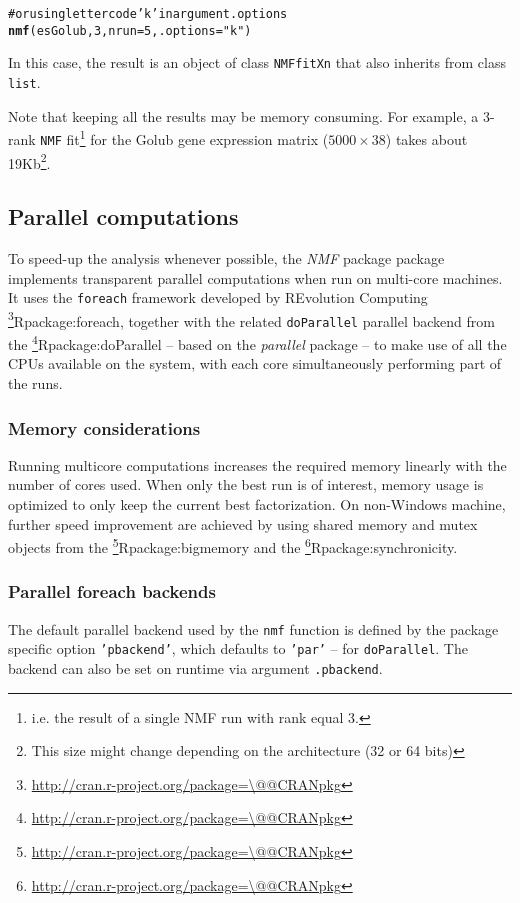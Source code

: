 \documentclass[a4paper]{article}\usepackage{graphicx, color}
\makeatletter
\newcommand{\hlfunctioncall}[1]{\textcolor[rgb]{0.501960784313725,0,0.329411764705882}{\textbf{#1}}}%
\newcommand{\hlstring}[1]{\textcolor[rgb]{0.6,0.6,1}{#1}}%
\newcommand{\hlcomment}[1]{\textcolor[rgb]{0.180392156862745,0.6,0.341176470588235}{#1}}%
\newenvironment{kframe}{%
 \def\at@end@of@kframe{}%
 \ifinner\ifhmode%
  \def\at@end@of@kframe{\end{minipage}}%
  \begin{minipage}{\columnwidth}%
 \fi\fi%
 \def\FrameCommand##1{\hskip\@totalleftmargin \hskip-\fboxsep
 \colorbox{shadecolor}{##1}\hskip-\fboxsep
     \hskip-\linewidth \hskip-\@totalleftmargin \hskip\columnwidth}%
 \MakeFramed {\advance\hsize-\width
   \@totalleftmargin\z@ \linewidth\hsize
   \@setminipage}}%
 {\par\unskip\endMakeFramed%
 \at@end@of@kframe}
\newenvironment{knitrout}{}{} %
\let\code=\texttt
\newcommand{\pkgname}[1]{\textit{#1}\xspace}
\newcommand{\Rpkg}[1]{\pkgname{#1} package\xspace}
\newcommand{\CRANurl}[1]{\url{http://cran.r-project.org/package=#1}}
\def\CRANpkg{\@ifstar\@CRANpkg\@@CRANpkg}
\def\@CRANpkg#1{\href{http://cran.r-project.org/package=#1}{\pkgname{#1}}\footnote{\CRANurl{#1}}}
\def\@@CRANpkg#1{\href{http://cran.r-project.org/package=#1}{\pkgname{#1}} package\footnote{\CRANurl{#1}}}
\def\citeCRANpkg{\@ifstar\@citeCRANpkg\@@citeCRANpkg}
\def\@citeCRANpkg#1{\CRANpkg{#1}\cite*{Rpackage:#1}}
\def\@@citeCRANpkg#1{\CRANpkg{#1}~\cite{Rpackage:#1}}
\newcommand{\nmfpack}{\Rpkg{NMF}}
\renewcommand{\cite}[1]{\parencite{#1}}
\makeatother
\begin{document}
\begin{knitrout}
\color{fgcolor}\begin{kframe}
\begin{alltt}
\hlcomment{# or using letter code 'k' in argument .options}
\hlfunctioncall{nmf}(esGolub, 3, nrun = 5, .options = \hlstring{"k"})
\end{alltt}
\end{kframe}
\end{knitrout}


In this case, the result is an object of class \code{NMFfitXn} that also inherits from class \code{list}.

Note that keeping all the results may be memory consuming. 
For example, a 3-rank \code{NMF} fit\footnote{i.e. the result of a single NMF run with rank equal 3.} for the Golub gene expression matrix ($5000 \times 38$) takes about 19Kb\footnote{This size might change depending on the architecture (32 or 64 bits)}.

\subsection{Parallel computations}\label{multicore}

To speed-up the analysis whenever possible, the \nmfpack package implements transparent parallel computations when run on multi-core machines.
It uses the \code{foreach} framework developed by REvolution Computing
\citeCRANpkg{foreach}, together with the related \code{doParallel} parallel
backend from the \citeCRANpkg{doParallel} -- based on the
\pkgname{parallel} package -- to make use of all the CPUs available on the
system, with each core simultaneously performing part of the runs. 

\subsubsection{Memory considerations}
Running multicore computations increases the required memory linearly
with the number of cores used.
When only the best run is of interest, memory usage is
optimized to only keep the current best factorization.
On non-Windows machine, further speed improvement are achieved by using shared
memory and mutex objects from the \citeCRANpkg{bigmemory} and the 
\citeCRANpkg{synchronicity}.

\subsubsection{Parallel foreach backends}
The default parallel backend used by the \code{nmf} function is defined by the
package specific option \code{'pbackend'}, which defaults to \code{'par'} -- for
\code{doParallel}.
The backend can also be set on runtime via argument \code{.pbackend}.
\end{document}
